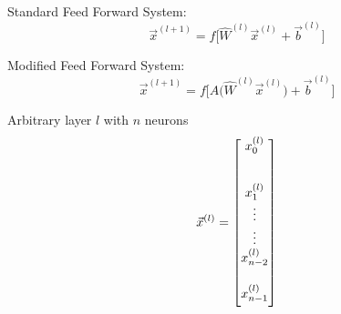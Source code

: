 \documentclass[12pt,letterpaper]{article}
\begin{document}
Standard Feed Forward System:
\begin{equation}
\label{Standard Feed Forward}
\vec{x}^{(l+1)} = f  \Big[\hat{W}^{(l)}\vec{x}^{(l)} + \vec{b}^{(l)} \Big]
\end{equation}

Modified Feed Forward System:
\begin{equation}
\label{Attack Feed Forward}
\vec{x}^{(l+1)} = f  \Big[ A\big(\hat{W}^{(l)}\vec{x}^{(l)}\big) + \vec{b}^{(l)} \Big]
\end{equation}

Arbitrary layer $l$ with $n$ neurons
\begin{equation}
\label{layer l}
\vec{x}^{(l)} = 
\begin{bmatrix}
\vspace{0.3cm}
x^{(l)}_{0} \vspace{0.5cm} \\ 
x^{(l)}_{1} \\ 
\vdots \\ \vdots \\ 
x^{(l)}_{n-2} \vspace{0.5cm} \\ 
x^{(l)}_{n-1} \vspace{0.2cm}
\end{bmatrix}
\end{equation}
\end{document}
